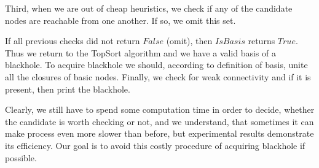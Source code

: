 \documentclass{svproc}
\newcommand{\FIXME}[1]{ %
	\colorbox{yellow}{#1}
}
\newcommand{\FIXME}[1]{ %
}
\begin{document}
Third, when we are out of cheap heuristics, we check if any of the candidate nodes are reachable from one another. 
If so, we omit this set.


If all previous checks did not return $False$ (omit), then $IsBasis$ returns $True$.
Thus we return to the TopSort algorithm and we have a valid basis of a blackhole.
To acquire blackhole we should, according to definition of basis, unite all the closures of basic nodes.
Finally, we check for weak connectivity and if it is present, then print the blackhole.

Clearly, we still have to spend some computation time in order to decide, whether
the candidate is worth checking or not, and we understand, that sometimes it can make process even more slower than before,
but experimental results demonstrate its efficiency.
Our goal is to avoid this costly procedure of acquiring blackhole if possible.
\end{document}
